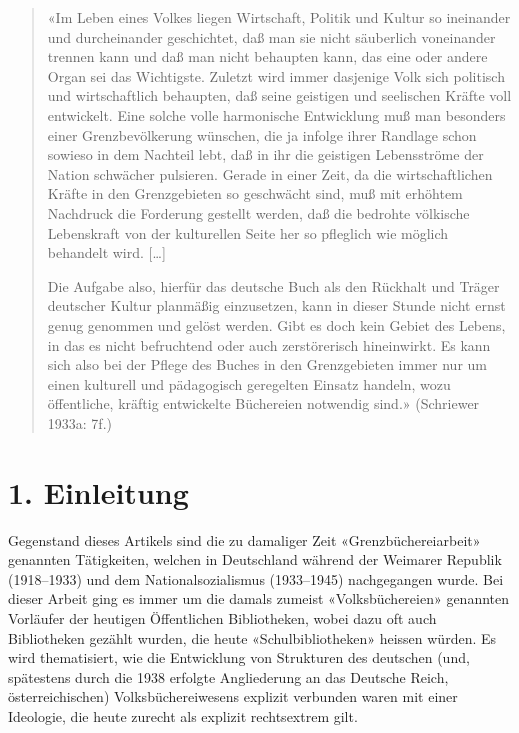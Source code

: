 \documentclass[a4paper,
fontsize=11pt,
oneside,
numbers=noperiodatend,
parskip=half-,
bibliography=totoc,
final
]{scrartcl}
\begin{document}
\begin{quote}
«Im Leben eines Volkes liegen Wirtschaft, Politik und Kultur so
ineinander und durcheinander geschichtet, daß man sie nicht säuberlich
voneinander trennen kann und daß man nicht behaupten kann, das eine oder
andere Organ sei das Wichtigste. Zuletzt wird immer dasjenige Volk sich
politisch und wirtschaftlich behaupten, daß seine geistigen und
seelischen Kräfte voll entwickelt. Eine solche volle harmonische
Entwicklung muß man besonders einer Grenzbevölkerung wünschen, die ja
infolge ihrer Randlage schon sowieso in dem Nachteil lebt, daß in ihr
die geistigen Lebensströme der Nation schwächer pulsieren. Gerade in
einer Zeit, da die wirtschaftlichen Kräfte in den Grenzgebieten so
geschwächt sind, muß mit erhöhtem Nachdruck die Forderung gestellt
werden, daß die bedrohte völkische Lebenskraft von der kulturellen Seite
her so pfleglich wie möglich behandelt wird. {[}\ldots{]}

Die Aufgabe also, hierfür das deutsche Buch als den Rückhalt und Träger
deutscher Kultur planmäßig einzusetzen, kann in dieser Stunde nicht
ernst genug genommen und gelöst werden. Gibt es doch kein Gebiet des
Lebens, in das es nicht befruchtend oder auch zerstörerisch hineinwirkt.
Es kann sich also bei der Pflege des Buches in den Grenzgebieten immer
nur um einen kulturell und pädagogisch geregelten Einsatz handeln, wozu
öffentliche, kräftig entwickelte Büchereien notwendig sind.» (Schriewer
1933a: 7f.)
\end{quote}

\hypertarget{einleitung}{%
\section{1. Einleitung}\label{einleitung}}

Gegenstand dieses Artikels sind die zu damaliger Zeit
«Grenzbüchereiarbeit» genannten Tätigkeiten, welchen in Deutschland
während der Weimarer Republik (1918--1933) und dem Nationalsozialismus
(1933--1945) nachgegangen wurde. Bei dieser Arbeit ging es immer um die
damals zumeist «Volksbüchereien» genannten Vorläufer der heutigen
Öffentlichen Bibliotheken, wobei dazu oft auch Bibliotheken gezählt
wurden, die heute «Schulbibliotheken» heissen würden. Es wird
thematisiert, wie die Entwicklung von Strukturen des deutschen (und,
spätestens durch die 1938 erfolgte Angliederung an das Deutsche Reich,
österreichischen) Volksbüchereiwesens explizit verbunden waren mit einer
Ideologie, die heute zurecht als explizit rechtsextrem gilt.
\end{document}
